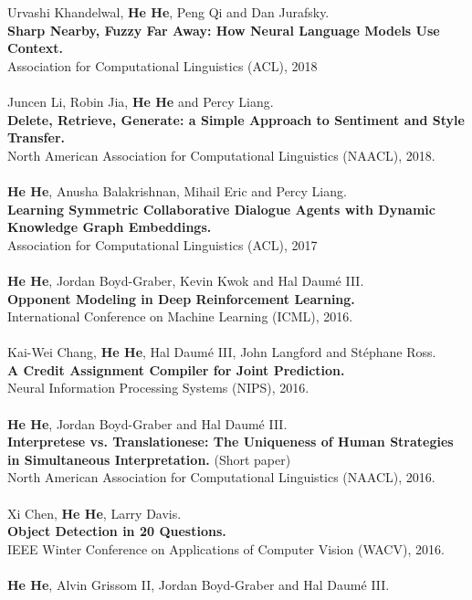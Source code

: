 \documentclass[a4paper,11pt]{article}
\begin{document}
Urvashi Khandelwal, {\bf He He}, Peng Qi and Dan Jurafsky.\\
{\bf Sharp Nearby, Fuzzy Far Away: How Neural Language Models Use Context.}\\
Association for Computational Linguistics (ACL), 2018\\
\\
Juncen Li, Robin Jia, {\bf He He} and Percy Liang.\\
{\bf Delete, Retrieve, Generate: a Simple Approach to Sentiment and Style Transfer.}\\
North American Association for Computational Linguistics (NAACL), 2018.\\
\\
{\bf He He}, Anusha Balakrishnan, Mihail Eric and Percy Liang.\\
{\bf Learning Symmetric Collaborative Dialogue Agents with Dynamic Knowledge Graph Embeddings.}\\
Association for Computational Linguistics (ACL), 2017\\
\\
{\bf He He}, Jordan Boyd-Graber, Kevin Kwok and Hal Daum\'e III.\\
{\bf Opponent Modeling in Deep Reinforcement Learning.}\\
International Conference on Machine Learning (ICML), 2016.\\
\\
Kai-Wei Chang, {\bf He He}, Hal Daum\'e III, John Langford and St\'ephane Ross.\\
{\bf A Credit Assignment Compiler for Joint Prediction.}\\
Neural Information Processing Systems (NIPS), 2016.\\ 
\\
{\bf He He}, Jordan Boyd-Graber and Hal Daum\'e III.\\
{\bf Interpretese vs. Translationese: The Uniqueness of Human Strategies in Simultaneous Interpretation.} (Short paper)\\
North American Association for Computational Linguistics (NAACL), 2016.\\
\\
Xi Chen, {\bf He He}, Larry Davis.\\
{\bf Object Detection in 20 Questions.}\\
IEEE Winter Conference on Applications of Computer Vision (WACV), 2016.\\
\\
{\bf He He}, Alvin Grissom II, Jordan Boyd-Graber and Hal Daum\'e III.\\
\end{document}
